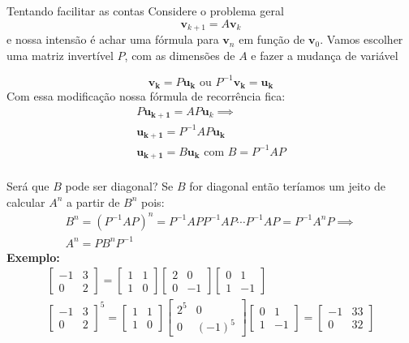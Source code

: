 \documentclass{beamer}
\begin{document}
\begin{frame}{Tentando facilitar as contas}
  Considere o problema geral
  $$ \mathbf{v}_{k+1} = A \mathbf{v}_k $$ e nossa intensão
  é achar uma fórmula para  $\mathbf{v}_n$ em função de 
  $\mathbf{v}_0$. Vamos escolher uma matriz invertível 
  $P$, com as dimensões de $A$ e fazer a mudança de variável 

  $$ \mathbf{v_k} = P\mathbf{u_k} \text{  ou  } P^{-1}\mathbf{v_k} = \mathbf{u_k} $$
  Com essa modificação nossa fórmula de recorrência fica:
  \begin{gather*}
    P\mathbf{u_{k+1}}=AP\mathbf{u}_k  \implies\\
    \mathbf{u_{k+1}} = P^{-1}AP\mathbf{u_k} \\
    \mathbf{u_{k+1}} = B\mathbf{u_k}  \text{ com } B = P^{-1}AP\\
  \end{gather*}
  
\end{frame}
\begin{frame}{Será que $B$ pode ser diagonal?}
  Se $B$ for diagonal então teríamos um jeito de calcular $A^n$ a partir de $B^n$ pois:
  \begin{gather*}
    B^n = (P^{-1}AP)^n=P^{-1}APP^{-1}AP\cdots P^{-1}AP = P^{-1}A^nP \implies \\
    A^n = PB^nP^{-1}
  \end{gather*}
  \textbf{Exemplo:}
  \begin{gather*}
    \begin{bmatrix}
      -1 & 3 \\
      0 & 2
    \end{bmatrix} = \begin{bmatrix}
      1 & 1 \\ 1 & 0 
    \end{bmatrix}\begin{bmatrix}
      2 & 0 \\ 0 & -1
    \end{bmatrix}\begin{bmatrix}
      0 & 1 \\ 1 & -1
    \end{bmatrix} \\
    \begin{bmatrix}
      -1 & 3 \\
      0 & 2
    \end{bmatrix}^5 = \begin{bmatrix}
      1 & 1 \\ 1 & 0 
    \end{bmatrix}\begin{bmatrix}
      2^5 & 0 \\ 0 & (-1)^5
    \end{bmatrix}\begin{bmatrix}
      0 & 1 \\ 1 & -1
    \end{bmatrix} = \begin{bmatrix}
      -1 & 33 \\ 0 & 32
    \end{bmatrix}
  \end{gather*}
  
\end{frame}
\end{document}
